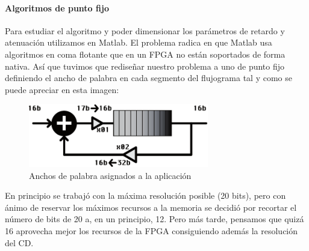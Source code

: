 \paragraph{Algoritmos de punto fijo} Para estudiar el algoritmo y poder dimensionar los parámetros de retardo y atenuación utilizamos en Matlab. El problema radica en que Matlab usa algoritmos en coma flotante que en un FPGA no están soportados de forma nativa. Así que tuvimos que rediseñar nuestro problema a uno de punto fijo definiendo el ancho de palabra en cada segmento del flujograma tal y como se puede apreciar en esta imagen:

\begin{figure}[h]
\begin{center}
	\includegraphics[width=0.7\textwidth]{./reverb_implemented_diagram-eps-converted-to}
\caption{Anchos de palabra asignados a la aplicación}
\label{default}
\end{center}
\end{figure}

	En principio se trabajó con la máxima resolución posible (20 bits), pero con ánimo de reservar los máximos recursos a la memoria se decidió por recortar el número de bits de 20 a, en un principio, 12. Pero más tarde, pensamos que quizá 16 aprovecha mejor los recursos de la FPGA consiguiendo además la resolución del CD.
	

